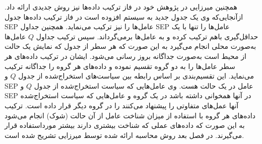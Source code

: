  همچنین میرزایی در پژوهش خود در فاز ترکیب داده‌ها نیز روش جدیدی ارائه داد. ازآنجایی‌که وی یک جدول جدید به سیستم افزوده است در فاز ترکیب داده‌ها جدول SEP عامل‌ها را نیز ترکیب می‌نماید. همچنین جداول SEP عامل‌ها را تنها با یک حداقل‌گیری باهم ترکیب کرده و به عامل‌ها برمی‌گرداند. سپس ترکیب جداول $Q$ عامل‌ها به‌صورت محلی انجام می‌گیرد به این صورت که هر سطر از جدول که نمایش یک حالت از محیط است به‌صورت جداگانه بروز رسانی می‌شود. ایشان در ترکیب داده‌های هر سطر عامل‌ها را به دو گروه تقسیم نموده و داده‌های هر گروه را جداگانه ترکیب می‌نماید. این تقسیم‌بندی بر اساس رابطه بین سیاست‌های استخراج‌شده از جدول $Q$ و SEP عامل در یک حالت هست. وی عامل‌هایی که سیاست استخراج‌شده از جدول $Q$ و SEP در آنها همخوانی داشته باشد در یک گروه و عامل‌هایی که سیاست استخراج‌شده آنها عمل‌های متفاوتی را پیشنهاد می‌کنند را در گروه دیگر قرار داده است. ترکیب داده‌های هر گروه با استفاده از میزان شناخت عامل از آن حالت (شوک) انجام می‌شود به این صورت که داده‌های عملی که شناخت بیشتری دارند بیشتر مورداستفاده قرار می‌گیرند. در فصل بعد روش محاسبه ارائه شده توسط میرزایی تشریح شده است.
